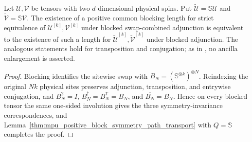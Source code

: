 \begin{lemma}
    \label{thm:mpu_positive_block_swap_comparison}
    \leanok
    Let $\mathcal U,\mathcal V$ be tensors with two $d$-dimensional
    physical spins. Put
    $\widetilde{\mathcal U}=\mathbb S\mathcal U$ and
    $\widetilde{\mathcal V}=\mathbb S\mathcal V$. The existence of a
    positive common blocking length for strict equivalence of
    $\mathcal U^{[k]},\mathcal V^{[k]}$ under blocked swap-combined
    adjunction is equivalent to the existence of such a length for
    $\widetilde{\mathcal U}^{[k]},\widetilde{\mathcal V}^{[k]}$ under
    blocked adjunction. The analogous statements hold for transposition
    and conjugation; as in \cite{gap:mpu_symmetry_ancilla_transport}, no
    ancilla enlargement is asserted.
\end{lemma}

\begin{proof}\leanok
    Blocking identifies the sitewise swap with
    $B_N=(\mathbb S^{\otimes k})^{\otimes N}$. Reindexing the original
    $Nk$ physical sites preserves adjunction, transposition, and
    entrywise conjugation, and
    $B_N^2=I$, $B_N^\dagger=B_N^{\mathsf T}=B_N$, and
    $\overline{B_N}=B_N$. Hence on every blocked tensor the same
    one-sided involution gives the three symmetry-invariance
    correspondences, and
    Lemma~\ref{thm:mpu_positive_block_symmetry_path_transport} with
    $Q=\mathbb S$ completes the proof.
\end{proof}


